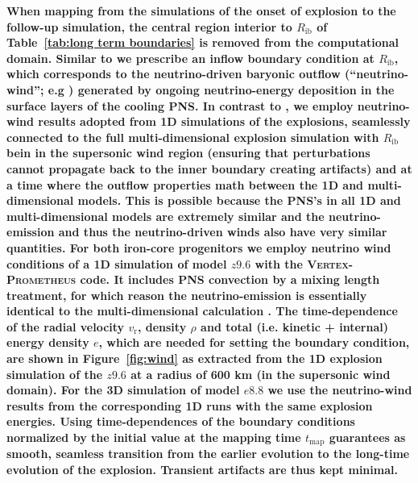 \documentclass[fleqn,usenatbib]{mnras}
\newcommand{\vertexprom}{\textsc{Vertex-Prometheus}\xspace}
\begin{document}
\textbf{
When mapping from the simulations of the onset of explosion to the follow-up simulation, the central region interior to $R_{\mathrm{ib}}$ of Table~\ref{tab:long term boundaries} is removed from the computational domain. Similar to \cite{Wongwathanarat2015} we prescribe an inflow boundary condition at $R_{\mathrm{ib}}$, which corresponds to the neutrino-driven baryonic outflow (``neutrino-wind''; e.g \citealt{Qian1996}) generated by ongoing neutrino-energy deposition in the surface layers of the cooling PNS. In contrast to \cite{Wongwathanarat2015}, we employ neutrino-wind results adopted from 1D simulations of the explosions, seamlessly connected to the full multi-dimensional explosion simulation with $R_{\mathrm{ib}}$ bein in the supersonic wind region (ensuring that perturbations cannot propagate back to the inner boundary creating artifacts) and at a time where  the outflow properties math between the 1D and multi-dimensional models. This is possible because the PNS's in all 1D and multi-dimensional models are extremely similar and the neutrino-emission and thus the neutrino-driven winds also have very similar quantities. 
For both iron-core progenitors we employ neutrino wind conditions of a 1D simulation of model $z9.6$ with the \vertexprom code. It includes PNS convection by a mixing length treatment, for which reason the neutrino-emission is essentially identical to the multi-dimensional calculation \citep{Mirizzi2016}. The time-dependence of the radial velocity $v_{\mathrm{r}}$, density $\rho$ and total (i.e. kinetic + internal) energy density $e$, which are needed for setting the boundary condition, are shown in Figure~\ref{fig:wind} as extracted from the 1D explosion simulation of the $z9.6$ at a radius of 600 km (in the supersonic wind domain).
For the 3D simulation of model $e8.8$ we use the neutrino-wind results from the corresponding 1D runs with the same explosion energies. Using time-dependences of the boundary conditions normalized by the initial value at the mapping time $t_{\mathrm{map}}$  guarantees as smooth, seamless transition from the earlier evolution to the long-time evolution of the explosion. Transient artifacts are thus kept minimal.
}
\end{document}
